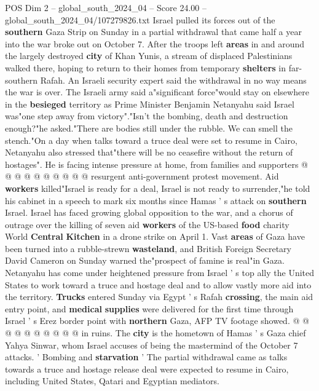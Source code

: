 \begin{textsample}{POS Dim 2 – global\_south\_2024\_04 – Score 24.00 – global\_south\_2024\_04/107279826.txt}  \label{ex:f2_pos_155}
Israel pulled its forces out of the \textbf{southern} Gaza Strip on Sunday in a partial withdrawal that came half a year into the war broke out on October 7.
After the troops left \textbf{areas} in and around the largely destroyed \textbf{city} of Khan Yunis, a stream of displaced Palestinians walked there, hoping to return to their homes from temporary \textbf{shelters} in far-southern Rafah.
An Israeli security expert said the withdrawal in no way means the war is over.
The Israeli army said a"significant force"would stay on elsewhere in the \textbf{besieged} territory as Prime Minister Benjamin Netanyahu said Israel was"one step away from victory"."Isn't the bombing, death and destruction enough?"he asked."There are bodies still under the rubble.
We can smell the stench."On a day when talks toward a truce deal were set to resume in Cairo, Netanyahu also stressed that"there will be no ceasefire without the return of hostages".
He is facing intense pressure at home, from families and supporters @ @ @ @ @ @ @ @ @ @ resurgent anti-government protest movement.
Aid \textbf{workers} killed"Israel is ready for a deal, Israel is not ready to surrender,"he told his cabinet in a speech to mark six months since Hamas ' s attack on \textbf{southern} Israel.
Israel has faced growing global opposition to the war, and a chorus of outrage over the killing of seven aid \textbf{workers} of the US-based \textbf{food} charity World \textbf{Central} \textbf{Kitchen} in a drone strike on April 1.
Vast \textbf{areas} of Gaza have been turned into a rubble-strewn \textbf{wasteland}, and British Foreign Secretary David Cameron on Sunday warned the"prospect of famine is real"in Gaza.
Netanyahu has come under heightened pressure from Israel ' s top ally the United States to work toward a truce and hostage deal and to allow vastly more aid into the territory. \textbf{Trucks} entered Sunday via Egypt ' s Rafah \textbf{crossing}, the main aid entry point, and \textbf{medical} \textbf{supplies} were delivered for the first time through Israel ' s Erez border point with \textbf{northern} Gaza, AFP TV footage showed. @ @ @ @ @ @ @ @ @ @ in ruins.
The \textbf{city} is the hometown of Hamas ' s Gaza chief Yahya Sinwar, whom Israel accuses of being the mastermind of the October 7 attacks. ' Bombing and \textbf{starvation} ' The partial withdrawal came as talks towards a truce and hostage release deal were expected to resume in Cairo, including United States, Qatari and Egyptian mediators.

\end{textsample}
